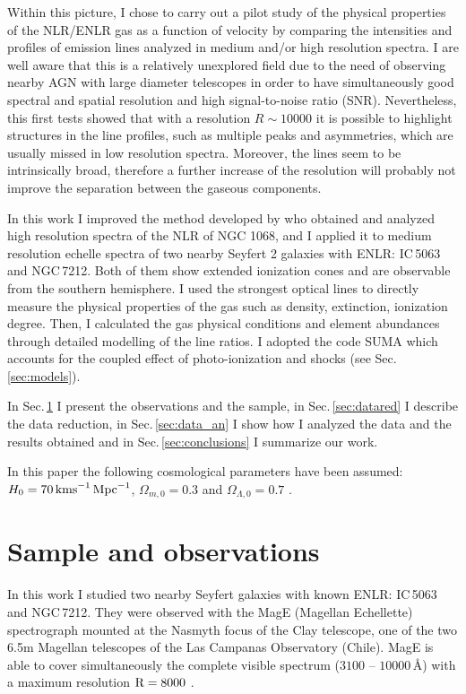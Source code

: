 \documentclass[../main.tex]{subfiles}
\begin{document}
Within this picture, I chose to carry out a pilot study of the physical properties of the NLR/ENLR gas as a function of velocity by comparing the intensities and profiles of emission lines analyzed in medium and/or high resolution spectra.
I are well aware that this is a relatively unexplored field due to the need of observing nearby AGN with large diameter telescopes in order to have simultaneously good spectral and spatial resolution and high signal-to-noise ratio (SNR).
Nevertheless, this first tests showed that with a resolution $R \sim  10000$ it is possible to highlight structures in the line profiles, such as multiple peaks and asymmetries, which are usually missed in low resolution spectra. 
Moreover, the lines seem to be intrinsically broad, therefore a further increase of the resolution will probably not improve the separation between the gaseous components.

In this work I improved the method developed by \citet{Ozaki09} who obtained and analyzed high resolution spectra of the NLR of NGC 1068, and I applied it to medium resolution echelle spectra of two nearby Seyfert 2 galaxies with ENLR: IC\,5063 and NGC\,7212.
Both of them show extended ionization cones and are observable from the southern hemisphere.
I used the strongest optical lines to directly measure the physical properties of the gas such as density, extinction, ionization degree. 
Then, I calculated the gas physical conditions and element abundances through detailed modelling of the line ratios. 
I adopted the code SUMA \citep{Contini12} which accounts for the coupled effect of photo-ionization and shocks (see Sec.\,\ref{sec:models}).

In Sec.\,\ref{sec:sample} I present the observations and the sample, in Sec.\,\ref{sec:datared} I describe the data reduction, in Sec.\,\ref{sec:data_an} I show how I analyzed the data and the results obtained and in Sec.\,\ref{sec:conclusions} I summarize our work.

In this paper the following cosmological parameters have been assumed:  $H_0 = 70\,\si{\kms\,Mpc^{-1}}$, $\Omega_{m,0}=0.3$ and $\Omega_{\Lambda,0}=0.7$ \citep{Komatsu11}.





\section{Sample and observations}
\label{sec:sample}

In this work I studied two nearby Seyfert galaxies with known ENLR: IC\,5063 and NGC\,7212.
They were observed with the MagE (Magellan Echellette) spectrograph mounted at the Nasmyth focus of the Clay telescope, one of the two 6.5m Magellan telescopes of the Las Campanas Observatory (Chile).
MagE is able to cover simultaneously the complete visible spectrum ($3100$ -- $10000\,\si{\angstrom}$) with a maximum resolution $\rm R=8000$ \citep{Marshall08}.
\end{document}
